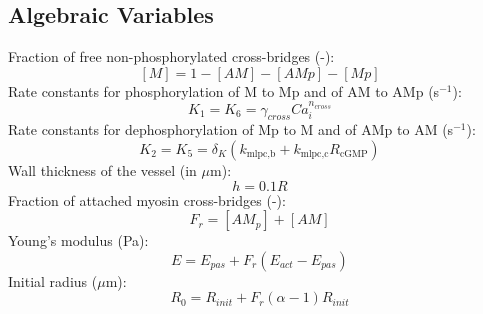 \documentclass[11pt]{elsarticle}
\newcommand{\um}{$\mu$m\xspace}
\newcommand{\psec}{s$^{-1}$\xspace}
\begin{document}
		\subsection{Algebraic Variables}
Fraction of free non-phosphorylated cross-bridges (-):
\begin{equation} \label{eq:dMdt}
[M]=1-[AM]-[AMp]-[Mp]
\end{equation}
%
Rate constants for phosphorylation of M to Mp and of AM to AMp (\psec):
\begin{equation} \label{eq:gamma}
K_{1} = K_{6} = \gamma_{cross} Ca_i ^{n_{cross}}
\end{equation}
%
Rate constants for dephosphorylation of Mp to M and of AMp to AM (\psec):
\begin{equation} 
K_{2} = K_{5} = \delta_K \left(k_{\text{mlpc,b}} + k_{\text{mlpc,c}} R_{\text{cGMP}}\right)
\end{equation}	
%
Wall thickness of the vessel (in \um):
\begin{equation} \label{eq:h2}
h=0.1 R
\end{equation}
%
Fraction of attached myosin cross-bridges (-):
\begin{equation}
F_r = [AM_p] + [AM]
\end{equation}
%
Young's modulus (Pa):
\begin{equation}
E = E_{pas} + F_r \left(E_{act} - E_{pas} \right)
\end{equation}
%
Initial radius (\um):
\begin{equation}
R_0 = R_{init} + F_r (\alpha -1) R_{init}
\end{equation}
%
\end{document}
